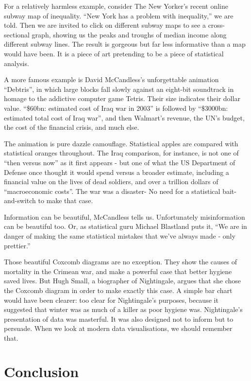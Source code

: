 \documentclass[]{book}
\theoremstyle{definition}
\theoremstyle{definition}
\theoremstyle{definition}
\theoremstyle{remark}
\begin{document}
For a relatively harmless example, consider The New Yorker's recent
online subway map of inequality. ``New York has a problem with
inequality,'' we are told. Then we are invited to click on different
subway maps to see a cross-sectional graph, showing us the peaks and
troughs of median income along different subway lines. The result is
gorgeous but far less informative than a map would have been. It is a
piece of art pretending to be a piece of statistical analysis.

A more famous example is David McCandless's unforgettable animation
``Debtris'', in which large blocks fall slowly against an eight-bit
soundtrack in homage to the addictive computer game Tetris. Their size
indicates their dollar value. ``\$60bn: estimated cost of Iraq war in
2003'' is followed by ``\$3000bn: estimated total cost of Iraq war'',
and then Walmart's revenue, the UN's budget, the cost of the financial
crisis, and much else.

The animation is pure dazzle camouflage. Statistical apples are compared
with statistical oranges throughout. The Iraq comparison, for instance,
is not one of ``then versus now'' as it first appears - but one of what
the US Department of Defense once thought it would spend versus a
broader estimate, including a financial value on the lives of dead
soldiers, and over a trillion dollars of ``macroeconomic costs''. The
war was a disaster- No need for a statistical bait-and-switch to make
that case.

Information can be beautiful, McCandless tells us. Unfortunately
misinformation can be beautiful too. Or, as statistical guru Michael
Blastland puts it, ``We are in danger of making the same statistical
mistakes that we've always made - only prettier.''

Those beautiful Coxcomb diagrams are no exception. They show the causes
of mortality in the Crimean war, and make a powerful case that better
hygiene saved lives. But Hugh Small, a biographer of Nightingale, argues
that she chose the Coxcomb diagram in order to make exactly this case. A
simple bar chart would have been clearer: too clear for Nightingale's
purposes, because it suggested that winter was as much of a killer as
poor hygiene was. Nightingale's presentation of data was masterful. It
was also designed not to inform but to persuade. When we look at modern
data visualisations, we should remember that.

\chapter{Conclusion}\label{conclusion}
\end{document}

